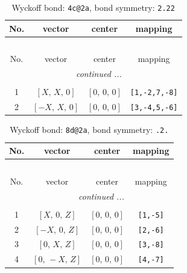 \documentclass[fleqn,8pt]{jsarticle}
\begin{document}
\renewcommand{\arraystretch}{1.2}
\begin{longtable}{cccc}
\caption{Wyckoff bond: {\tt 4c@2a}, bond symmetry: {\tt 2.22}}
 \\
 \hline \hline
No. & vector & center & mapping \\ \hline \endfirsthead

\multicolumn{3}{l}{\tablename\ \thetable{}} \\
 \hline \hline
No. & vector & center & mapping \\ \hline \endhead

 \hline \hline
\multicolumn{3}{r}{\footnotesize\it continued ...} \\ \endfoot

 \hline \hline
\multicolumn{3}{r}{} \\ \endlastfoot

1 & $\left[ X,\, X,\, 0 \right]$ & $\left[ 0,\, 0,\, 0 \right]$ & {\tt [1,-2,7,-8]} \\ \hline
2 & $\left[ - X,\, X,\, 0 \right]$ & $\left[ 0,\, 0,\, 0 \right]$ & {\tt [3,-4,5,-6]} \\
\end{longtable}
\renewcommand{\arraystretch}{1.2}
\begin{longtable}{cccc}
\caption{Wyckoff bond: {\tt 8d@2a}, bond symmetry: {\tt .2.}}
 \\
 \hline \hline
No. & vector & center & mapping \\ \hline \endfirsthead

\multicolumn{3}{l}{\tablename\ \thetable{}} \\
 \hline \hline
No. & vector & center & mapping \\ \hline \endhead

 \hline \hline
\multicolumn{3}{r}{\footnotesize\it continued ...} \\ \endfoot

 \hline \hline
\multicolumn{3}{r}{} \\ \endlastfoot

1 & $\left[ X,\, 0,\, Z \right]$ & $\left[ 0,\, 0,\, 0 \right]$ & {\tt [1,-5]} \\ \hline
2 & $\left[ - X,\, 0,\, Z \right]$ & $\left[ 0,\, 0,\, 0 \right]$ & {\tt [2,-6]} \\ \hline
3 & $\left[ 0,\, X,\, Z \right]$ & $\left[ 0,\, 0,\, 0 \right]$ & {\tt [3,-8]} \\ \hline
4 & $\left[ 0,\, - X,\, Z \right]$ & $\left[ 0,\, 0,\, 0 \right]$ & {\tt [4,-7]} \\
\end{longtable}
\end{document}
